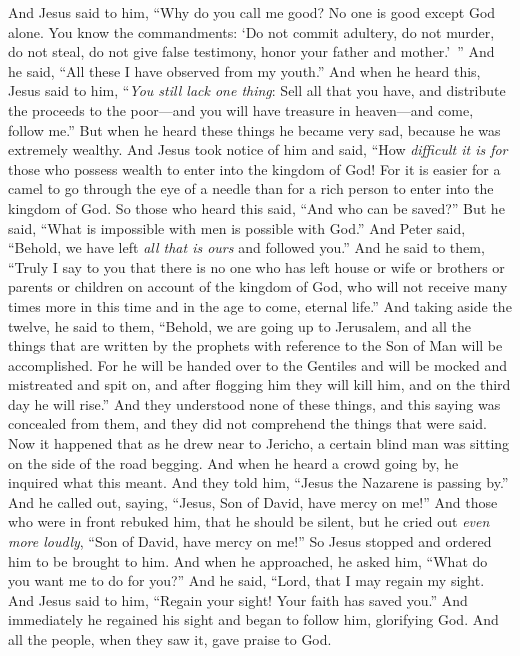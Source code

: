 \begin{biblechapter}
\verse And Jesus said to him, “Why do you call me good? No one is good except God alone.
\verse You know the commandments: ‘Do not commit adultery, do not murder, do not steal, do not give false testimony, honor your father and mother.’ ”
\verse And he said, “All these I have observed from my youth.”
\verse And when he heard this, Jesus said to him, “\textit{You still lack one thing}: Sell all that you have, and distribute the proceeds to the poor—and you will have treasure in heaven—and come, follow me.”
\verse But when he heard these things he became very sad, because he was extremely wealthy.
\verse And Jesus took notice of him and said, “How \textit{difficult it is for} those who possess wealth to enter into the kingdom of God!
\verse For it is easier for a camel to go through the eye of a needle than for a rich person to enter into the kingdom of God.
\verse So those who heard this said, “And who can be saved?”
\verse But he said, “What is impossible with men is possible with God.”
\verse And Peter said, “Behold, we have left \textit{all that is ours} and followed you.”
\verse And he said to them, “Truly I say to you that there is no one who has left house or wife or brothers or parents or children on account of the kingdom of God,
\verse who will not receive many times more in this time and in the age to come, eternal life.”
 And taking aside the twelve, he said to them, “Behold, we are going up to Jerusalem, and all the things that are written by the prophets with reference to the Son of Man will be accomplished.
\verse For he will be handed over to the Gentiles and will be mocked and mistreated and spit on,
\verse and after flogging him they will kill him, and on the third day he will rise.”
\verse And they understood none of these things, and this saying was concealed from them, and they did not comprehend the things that were said.
 Now it happened that as he drew near to Jericho, a certain blind man was sitting on the side of the road begging.
\verse And when he heard a crowd going by, he inquired what this meant.
\verse And they told him, “Jesus the Nazarene is passing by.”
\verse And he called out, saying, “Jesus, Son of David, have mercy on me!”
\verse And those who were in front rebuked him, that he should be silent, but he cried out \textit{even more loudly}, “Son of David, have mercy on me!”
\verse So Jesus stopped and ordered him to be brought to him. And when he approached, he asked him,
\verse “What do you want me to do for you?” And he said, “Lord, that I may regain my sight.
\verse And Jesus said to him, “Regain your sight! Your faith has saved you.”
\verse And immediately he regained his sight and began to follow him, glorifying God. And all the people, when they saw it, gave praise to God.
\end{biblechapter}

